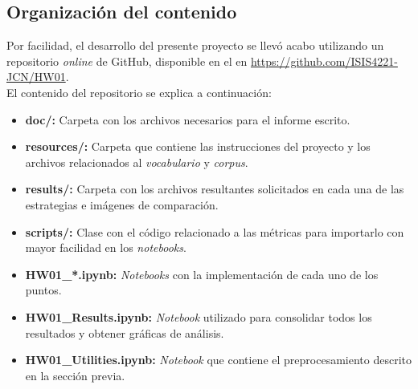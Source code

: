 \subsection*{Organización del contenido}
Por facilidad, el desarrollo del presente proyecto se llevó acabo utilizando un repositorio \textit{online} de GitHub, disponible en el en \url{https://github.com/ISIS4221-JCN/HW01}.\\

El contenido del repositorio se explica a continuación:
\begin{itemize}
    \item \textbf{doc/:} Carpeta con los archivos necesarios para el informe escrito.
    \item \textbf{resources/:} Carpeta que contiene las instrucciones del proyecto y los archivos relacionados al \textit{vocabulario} y \textit{corpus}.
    \item \textbf{results/:} Carpeta con los archivos resultantes solicitados en cada una de las estrategias e imágenes de comparación.
    \item \textbf{scripts/:} Clase con el código relacionado a las métricas para importarlo con mayor facilidad en los \textit{notebooks}.
    \item \textbf{HW01\_*.ipynb:} \textit{Notebooks} con la implementación de cada uno de los puntos.
    \item \textbf{HW01\_Results.ipynb:} \textit{Notebook} utilizado para consolidar todos los resultados y obtener gráficas de análisis.
    \item \textbf{HW01\_Utilities.ipynb:} \textit{Notebook} que contiene el preprocesamiento descrito en la sección previa.
\end{itemize}